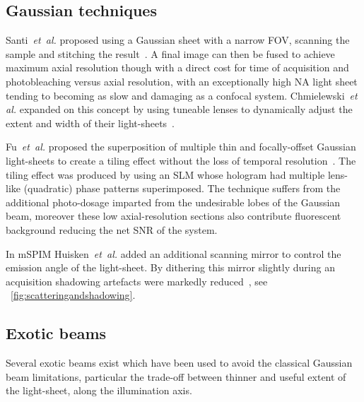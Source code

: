 \subsection{Gaussian techniques}

Santi~\emph{et~al.} proposed using a Gaussian sheet with a narrow \gls{FOV}, scanning the sample and stitching the result~\cite{santiThinsheetLaserImaging2009}.
A final image can then be fused to achieve maximum axial resolution though with a direct cost for time of acquisition and photobleaching versus axial resolution, with an exceptionally high \gls{NA} light sheet tending to becoming as slow and damaging as a confocal system.
Chmielewski~\emph{et al.} expanded on this concept by using tuneable lenses to dynamically adjust the extent and width of their \gls{light-sheet}s~\cite{chmielewskiFastImagingLive2015}.

Fu~\emph{et~al.} proposed the superposition of multiple thin and focally-offset Gaussian \gls{light-sheet}s to create a tiling effect without the loss of temporal resolution~\cite{fu_imaging_2016}.
The tiling effect was produced by using an \gls{SLM} whose hologram had multiple lens-like (quadratic) phase patterns superimposed.
The technique suffers from the additional photo-dosage imparted from the undesirable lobes of the Gaussian beam, moreover these low axial-resolution sections also contribute fluorescent background reducing the net \gls{SNR} of the system.

In \gls{mSPIM} Huisken~\emph{et~al.} added an additional scanning mirror to control the emission angle of the \gls{light-sheet}.
By dithering this mirror slightly during an acquisition shadowing artefacts were markedly reduced~\cite{huiskenEvenFluorescenceExcitation2007}, see \figurename~\ref{fig:scatteringandshadowing}.

\subsection{Exotic beams}

Several \gls{exotic beam}s exist which have been used to avoid the
classical \gls{Gaussian beam} limitations, particular the trade-off between thinner and useful extent of the light-sheet, along the illumination axis.
